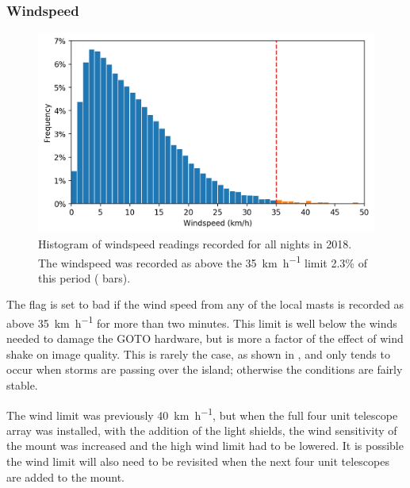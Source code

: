 \subsubsection{Windspeed}

\begin{figure}[t]
    \begin{center}
        \includegraphics[width=\linewidth]{images/conditions/windspeed.png}
    \end{center}
    \caption[Histogram of windspeed readings]{
        Histogram of windspeed readings recorded for all nights in 2018. The windspeed was recorded as above the \SI[per-mode=symbol]{35}{\kilo\metre\per\hour} limit 2.3\% of this period ( bars).
    }\label{fig:windspeed}
\end{figure}

The  flag is set to bad if the wind speed from any of the local masts is recorded as above \SI[per-mode=symbol]{35}{\kilo\meter\per\hour} for more than two minutes. This limit is well below the winds needed to damage the GOTO hardware, but is more a factor of the effect of wind shake on image quality. This is rarely the case, as shown in , and only tends to occur when storms are passing over the island; otherwise the conditions are fairly stable.

The wind limit was previously \SI[per-mode=symbol]{40}{\kilo\metre\per\hour}, but when the full four unit telescope array was installed, with the addition of the light shields, the wind sensitivity of the mount was increased and the high wind limit had to be lowered. It is possible the wind limit will also need to be revisited when the next four unit telescopes are added to the mount.


